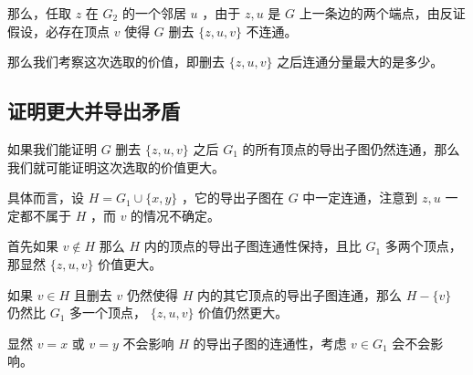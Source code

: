 \documentclass[11pt, a4paper]{ctexart}
\begin{document}
那么，任取 $z$ 在 $G_2$ 的一个邻居 $u$ ，由于 $z,u$ 是 $G$ 上一条边的两个端点，由反证假设，必存在顶点 $v$ 使得 $G$ 删去 $\{z,u,v\}$ 不连通。

那么我们考察这次选取的价值，即删去 $\{z,u,v\}$ 之后连通分量最大的是多少。

\subsection{证明更大并导出矛盾}
如果我们能证明 $G$ 删去 $\{z,u,v\}$ 之后 $G_1$ 的所有顶点的导出子图仍然连通，那么我们就可能证明这次选取的价值更大。

具体而言，设 $H=G_1\cup \{x,y\}$ ，它的导出子图在 $G$ 中一定连通，注意到 $z,u$ 一定都不属于 $H$ ，而 $v$ 的情况不确定。

首先如果 $v\notin H$ 那么 $H$ 内的顶点的导出子图连通性保持，且比 $G_1$ 多两个顶点，那显然 $\{z,u,v\}$ 价值更大。

如果 $v\in H$ 且删去 $v$ 仍然使得 $H$ 内的其它顶点的导出子图连通，那么 $H-\{v\}$ 仍然比 $G_1$ 多一个顶点， $\{z,u,v\}$ 价值仍然更大。

显然 $v=x$ 或 $v=y$ 不会影响 $H$ 的导出子图的连通性，考虑 $v\in G_1$ 会不会影响。
\end{document}
